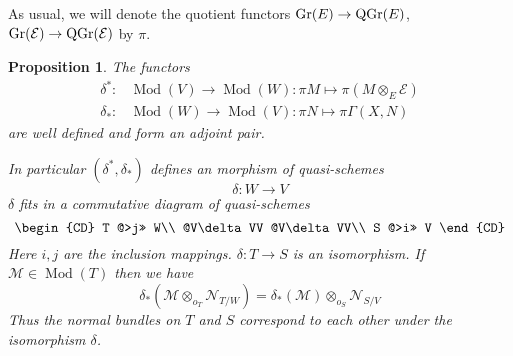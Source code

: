 \documentclass{amsproc}
\def\Escr{{\mathcal E}}
\def\Mscr{{\mathcal M}}
\def\Nscr{{\mathcal N}}
\def\Gr{\mathop{\text{Gr}}}
\def\Qch{\operatorname {Mod}}
\def\r{\rightarrow}
\let\oldtext\text
\def\text#1{\oldtext{\upshape #1}}
\DeclareMathOperator{\QGr}{QGr}
\newtheorem{propositions}[lemmas]{Proposition}
\theoremstyle{definition}
\theoremstyle{remark}
\numberwithin{equation}{section}
\numberwithin{table}{section}
\numberwithin{figure}{section}
\def\Gr{\mathop{\text{Gr}}}
\begin{document}
As usual, we will denote the
quotient functors $\Gr(E)\r \QGr(E)$, $\Gr(\Escr)\r \QGr(\Escr)$ by $\pi$.
\begin{propositions} The functors
\begin{align*}
\delta^\ast:&\Qch(V)\r \Qch(W): \pi M\mapsto \pi(M\otimes_E \Escr)\\
\delta_\ast:&\Qch(W)\r \Qch(V):\pi N\mapsto
\pi\Gamma(X,N) \end{align*}
are well defined and  form an  adjoint pair.

  In
particular $(\delta^\ast,\delta_\ast)$ defines an morphism of quasi-schemes
\[
\delta:W\r V
\]
$\delta$ fits in a commutative diagram of quasi-schemes
\begin{equation}
\label{ref:9.3a}
\begin{CD}
T @>j>> W\\
@V\delta VV @V\delta VV\\
S @>i>> V
\end{CD}
\end{equation}
Here $i,j$ are the inclusion mappings. $\delta:T\r S$ is an
isomorphism.  If $\Mscr\in \Qch(T)$ then we have
\begin{equation}
\label{ref:9.4a}
\delta_\ast(\Mscr\otimes_{o_T} \Nscr_{T/W})=\delta_\ast(\Mscr)\otimes_{o_S}
\Nscr_{S/V}
\end{equation}
Thus the normal bundles on $T$ and $S$ correspond to each other under
the isomorphism $\delta$.
\end{propositions}
\end{document}
